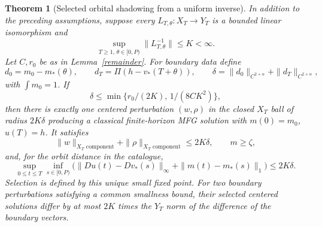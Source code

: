 \documentclass[11pt]{article}
\newtheorem{theorem}{Theorem}
\begin{document}
\begin{theorem}[Selected orbital shadowing from a uniform inverse]\label{conditional}
In addition to the preceding assumptions, suppose every
$L_{T,\theta}:X_T\to Y_T$ is a bounded linear isomorphism and
\begin{equation}\label{inverse}
 \sup_{T\geq1,\,\theta\in[0,P)}\|L_{T,\theta}^{-1}\|\leq K<\infty.
\end{equation}
Let $C,r_0$ be as in Lemma~\ref{remainder}. For boundary data define
\[
 d_0=m_0-m_*(\theta),\qquad
 d_T=\Pi(h-v_*(T+\theta)),\qquad
 \delta=\|d_0\|_{C^{2+\alpha}}+\|d_T\|_{C^{2+\alpha}},
\]
with $\int m_0=1$. If
\begin{equation}\label{small}
 \delta\leq\min\{r_0/(2K),\,1/(8CK^2)\},
\end{equation}
then there is exactly one centered perturbation $(w,\rho)$ in the
closed $X_T$ ball of radius $2K\delta$ producing a classical
finite-horizon MFG solution with $m(0)=m_0$, $u(T)=h$.
It satisfies
\[
 \|w\|_{X_T\text{ component}}+\|\rho\|_{X_T\text{ component}}
 \leq2K\delta,\qquad m\geq\zeta,
\]
and, for the orbit distance in the catalogue,
\[
 \sup_{0\leq t\leq T}
 \inf_{s\in[0,P)}\bigl(\|Du(t)-Dv_*(s)\|_\infty
                       +\|m(t)-m_*(s)\|_1\bigr)
 \leq2K\delta.
\]
Selection is defined by this unique small fixed point. For two boundary
perturbations satisfying a common smallness bound, their selected centered
solutions differ by at most $2K$ times the $Y_T$ norm of the difference
of the boundary vectors.
\end{theorem}
\end{document}
